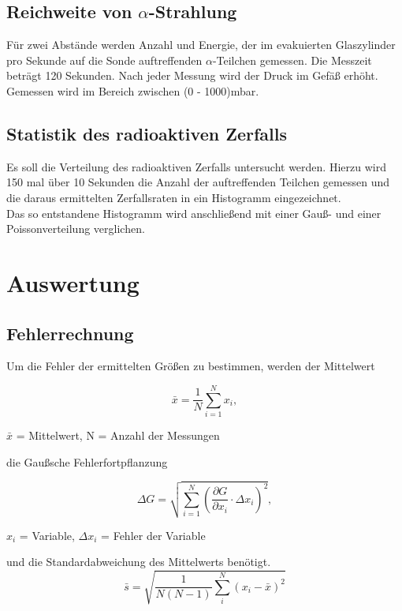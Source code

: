 \subsection{Reichweite von $\alpha$-Strahlung}
Für zwei Abstände werden Anzahl und Energie, der im evakuierten Glaszylinder pro Sekunde auf die Sonde auftreffenden $\alpha$-Teilchen gemessen. Die Messzeit beträgt 120 Sekunden. Nach jeder Messung wird der Druck im Gefäß erhöht. Gemessen wird im Bereich zwischen (0 - 1000)mbar.\\

\subsection{Statistik des radioaktiven Zerfalls}
Es soll die Verteilung des radioaktiven Zerfalls untersucht werden. Hierzu wird 150 mal über 10 Sekunden die Anzahl der auftreffenden Teilchen gemessen und die daraus ermittelten Zerfallsraten in ein Histogramm eingezeichnet.\\
Das so entstandene Histogramm wird anschließend mit einer Gauß- und einer Poissonverteilung verglichen.
\section{Auswertung}
\subsection{Fehlerrechnung}
Um die Fehler der ermittelten Größen zu bestimmen, werden der Mittelwert
\begin{formel}[H]
\begin{equation}
 \bar{x} = \frac1N \sum_{i=1}^{N} x_i,
 \label{eq_mittel}
\end{equation}
\caption*{\small{$\bar{x}$ = Mittelwert, N = Anzahl der Messungen}}
\end{formel}
die Gaußsche Fehlerfortpflanzung
\begin{formel}[H]
\begin{equation}
\Delta G = \sqrt{\sum_{i=1}^{N}\left( \frac{\partial G}{\partial x_i}\cdot \Delta x_i\right)^2},
\label{gauss}
\end{equation}
\caption*{$x_i$ = Variable, $\Delta x_i$ = Fehler der Variable}
\end{formel}
und die Standardabweichung des Mittelwerts benötigt.
\begin{equation}
 \bar s = \sqrt{\frac{1}{N(N-1)} \sum_{i}^{N} (x_i - \bar{x})^2}
 \label{eq_standard}
\end{equation}
\newpage

